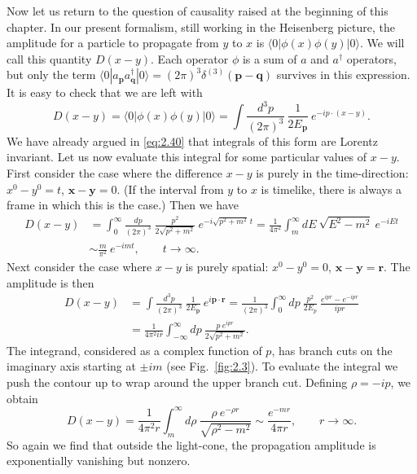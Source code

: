 Now let us return to the question of causality raised at the beginning of
this chapter.  In our present formalism, still working in the Heisenberg
picture, the amplitude for a particle to propagate from $y$ to $x$ is
$\langle 0|\phi(x)\phi(y)|0\rangle$.  We will call this quantity
$D(x-y)$.  Each operator $\phi$ is a sum of $a$ and $a^\dagger$ operators,
but only the term $\langle 0|a_{\mathbf{p}}a_{\mathbf{q}}^\dagger|0\rangle
= (2\pi)^3\delta^{(3)}(\mathbf{p}-\mathbf{q})$ survives in this
expression.  It is easy to check that we are left with
\begin{equation}
  D(x-y) = \langle 0|\phi(x)\phi(y)|0\rangle
  = \int \frac{d^3p}{(2\pi)^3}\ \frac{1}{2E_{\mathbf{p}}}\
    e^{-ip\cdot(x-y)} .
  \label{eq:2.50}
\end{equation}
We have already argued in \eqref{eq:2.40} that integrals of this form are
Lorentz invariant.  Let us now evaluate this integral for some particular
values of $x-y$.  First consider the case where the difference $x-y$ is
purely in the time-direction: $x^0-y^0=t$, $\mathbf{x}-\mathbf{y}=0$.
(If the interval from $y$ to $x$ is timelike, there is always a frame in
which this is the case.)  Then we have
\begin{align}
  D(x-y) &= \int_0^\infty \frac{dp}{(2\pi)^3}\ \frac{p^2}{2\sqrt{p^2+m^2}}\
    e^{-i\sqrt{p^2+m^2}\,t}
  = \frac{1}{4\pi^2}\int_m^\infty dE\ \sqrt{E^2-m^2}\ e^{-iEt}\\
  &\sim \frac{m}{\pi^2}\ e^{-imt},\qquad t\to\infty .
  \label{eq:2.51}
\end{align}
Next consider the case where $x-y$ is purely spatial: $x^0-y^0=0$,
$\mathbf{x}-\mathbf{y}=\mathbf{r}$.  The amplitude is then
\begin{align}
  D(x-y) &= \int \frac{d^3p}{(2\pi)^3}\ \frac{1}{2E_{\mathbf{p}}}\
    e^{i\mathbf{p}\cdot\mathbf{r}}
  = \frac{1}{(2\pi)^3}\int_0^\infty dp\ \frac{p^2}{2E_p}\
    \frac{e^{ipr}-e^{-ipr}}{ipr}\\
  &= \frac{1}{4\pi^2 i r}\int_{-\infty}^{\infty} dp\ \frac{p\ e^{ipr}}
    {2\sqrt{p^2+m^2}} .
\end{align}
The integrand, considered as a complex function of $p$, has branch cuts on
the imaginary axis starting at $\pm im$ (see Fig.~\ref{fig:2.3}).  To
evaluate the integral we push the contour up to wrap around the upper
branch cut.  Defining $\rho = -ip$, we obtain
\begin{equation}
  D(x-y) = \frac{1}{4\pi^2 r}\int_m^\infty d\rho\
    \frac{\rho\ e^{-\rho r}}{\sqrt{\rho^2-m^2}}
  \sim \frac{e^{-mr}}{4\pi r},\qquad r\to\infty .
  \label{eq:2.52}
\end{equation}
So again we find that outside the light-cone, the propagation amplitude is
exponentially vanishing but nonzero.

